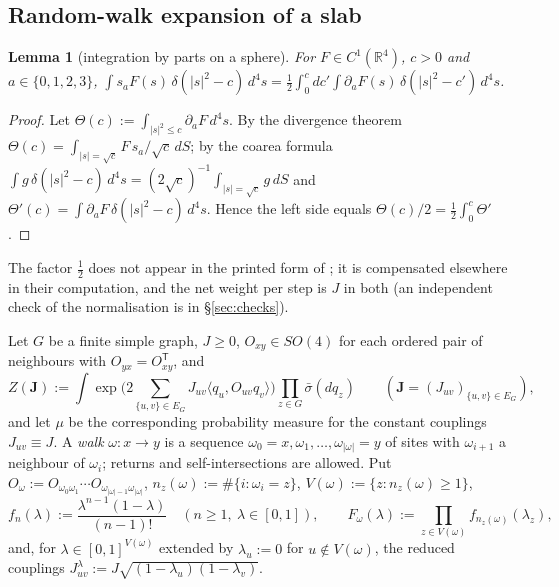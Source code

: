 \documentclass[11pt,a4paper]{article}
\theoremstyle{plain}
\newtheorem{lemma}[theorem]{Lemma}
\theoremstyle{remark}
\numberwithin{equation}{section}
\newcommand{\R}{\mathbb{R}}
\newcommand{\bs}{\boldsymbol}
\begin{document}
\subsection{Random-walk expansion of a slab}
\begin{lemma}[integration by parts on a sphere]\label{lem:ipp}
For $F\in C^1(\R^4)$, $c>0$ and $a\in\{0,1,2,3\}$,
$\displaystyle\int s_aF(s)\,\delta(|s|^2-c)\,d^4s=\frac12\int_0^c dc'\int\partial_aF(s)\,\delta(|s|^2-c')\,d^4s$.
\end{lemma}
\begin{proof}
Let $\Theta(c):=\int_{|s|^2\le c}\partial_aF\,d^4s$. By the divergence theorem $\Theta(c)=\int_{|s|=\sqrt c}F\,s_a/\sqrt c\,dS$; by the
coarea formula $\int g\,\delta(|s|^2-c)\,d^4s=(2\sqrt c)^{-1}\int_{|s|=\sqrt c}g\,dS$ and $\Theta'(c)=\int\partial_aF\,\delta(|s|^2-c)\,
d^4s$. Hence the left side equals $\Theta(c)/2=\frac12\int_0^c\Theta'$.
\end{proof}
\noindent The factor $\frac12$ does not appear in the printed form of \cite[Lemma~B.1(i), p.~374]{BS83}; it is compensated elsewhere in their
computation, and the net weight per step is $J$ in both (an independent check of the normalisation is in \S\ref{sec:checks}).

Let $G$ be a finite simple graph, $J\ge0$, $O_{xy}\in SO(4)$ for each ordered pair of neighbours with $O_{yx}=O_{xy}^{\mathsf T}$, and
\[
Z(\bs J):=\int\exp\Big(2\sum_{\{u,v\}\in E_G}J_{uv}\langle q_u,O_{uv}q_v\rangle\Big)\prod_{z\in G}\bar\sigma(dq_z)
\qquad(\bs J=(J_{uv})_{\{u,v\}\in E_G}),
\]
and let $\mu$ be the corresponding probability measure for the constant couplings $J_{uv}\equiv J$.
A \emph{walk} $\omega:x\to y$ is a sequence $\omega_0=x,\omega_1,\dots,\omega_{|\omega|}=y$ of sites with $\omega_{i+1}$ a neighbour
of $\omega_i$; returns and self-intersections are allowed. Put $O_\omega:=O_{\omega_0\omega_1}\cdots O_{\omega_{|\omega|-1}
\omega_{|\omega|}}$, $n_z(\omega):=\#\{i:\omega_i=z\}$, $V(\omega):=\{z:n_z(\omega)\ge1\}$,
\begin{equation}\label{eq:fn}
f_n(\lambda):=\frac{\lambda^{n-1}(1-\lambda)}{(n-1)!}\quad(n\ge1,\ \lambda\in[0,1]),\qquad F_\omega(\lambda):=\prod_{z\in V(\omega)}
f_{n_z(\omega)}(\lambda_z),
\end{equation}
and, for $\lambda\in[0,1]^{V(\omega)}$ extended by $\lambda_u:=0$ for $u\notin V(\omega)$, the reduced couplings
$J^\lambda_{uv}:=J\sqrt{(1-\lambda_u)(1-\lambda_v)}$.
\end{document}
